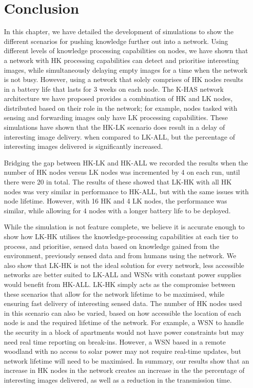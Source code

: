 \section{Conclusion}
	
In this chapter, we have detailed the development of simulations to show the different scenarios for pushing knowledge further out into a network. Using different levels of knowledge processing capabilities on nodes, we have shown that a network with HK processing capabilities can detect and prioritise interesting images, while simultaneously delaying empty images for a time when the network is not busy. However, using a network that solely comprises of HK nodes results in a battery life that lasts for 3 weeks on each node. The K-HAS network architecture we have proposed provides a combination of HK and LK nodes, distributed based on their role in the network; for example, nodes tasked with sensing and forwarding images only have LK processing capabilities. These simulations have shown that the HK-LK scenario does result in a delay of interesting image delivery. when compared to LK-ALL, but the percentage of interesting images delivered is significantly increased.

Bridging the gap between HK-LK and HK-ALL we recorded the results when the number of HK nodes versus LK nodes was incremented by 4 on each run, until there were 20 in total. The results of these showed that LK-HK with all HK nodes was very similar in performance to HK-ALL, but with the same issues with node lifetime. However, with 16 HK and 4 LK nodes, the performance was similar, while allowing for 4 nodes with a longer battery life to be deployed.

While the simulation is not feature complete, we believe it is accurate enough to show how LK-HK utilises the knowledge-processing capabilities at each tier to process, and prioritise, sensed data based on knowledge gained from the environment, previously sensed data and from humans using the network. We also show that LK-HK is not the ideal solution for every network, less accessible networks are better suited to LK-ALL and WSNs with constant power supplies would benefit from HK-ALL. LK-HK simply acts as the compromise between these scenarios that allow for the network lifetime to be maximised, while ensuring fast delivery of interesting sensed data. The number of HK nodes used in this scenario can also be varied, based on how accessible the location of each node is and the required lifetime of the network. For example, a WSN to handle the security in a block of apartments would not have power constraints but may need real time reporting on break-ins. However, a WSN based in a remote woodland with no access to solar power may not require real-time updates, but network lifetime will need to be maximised. In summary, our results show that an increase in HK nodes in the network creates an increase in the the percentage of interesting images delivered, as well as a reduction in the transmission time.


